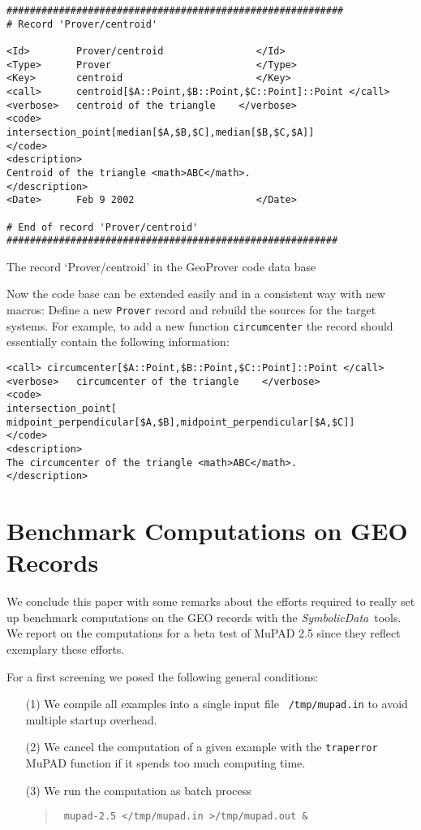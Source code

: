 \documentclass[11pt]{article}
\newcommand{\SD}{{\it Symbo\-lic\-Data}}
\newcommand{\gf}[1]{{\tt #1}\/}
\begin{document}
\begin{table}[ht]\label{table:3}{\small
\begin{verbatim}
##########################################################
# Record 'Prover/centroid' 

<Id>        Prover/centroid                </Id>
<Type>      Prover                         </Type>
<Key>       centroid                       </Key>
<call>      centroid[$A::Point,$B::Point,$C::Point]::Point </call>
<verbose>   centroid of the triangle    </verbose>
<code>      
intersection_point[median[$A,$B,$C],median[$B,$C,$A]] 
</code>
<description> 
Centroid of the triangle <math>ABC</math>. 
</description>
<Date>      Feb 9 2002                     </Date>
  
# End of record 'Prover/centroid'
#########################################################
\end{verbatim}}%
\centerline{The record `Prover/centroid' in the GeoProver code data
base}
\end{table}

Now the code base can be extended easily and in a consistent way
with new macros: Define a new {\tt Prover} record and rebuild the
sources for the target systems.  For example, to add a new
function \gf{circumcenter} the record should essentially contain
the following information:

{\small
\begin{verbatim}
<call> circumcenter[$A::Point,$B::Point,$C::Point]::Point </call>
<verbose>   circumcenter of the triangle    </verbose>
<code>      
intersection_point[
midpoint_perpendicular[$A,$B],midpoint_perpendicular[$A,$C]]
</code>
<description> 
The circumcenter of the triangle <math>ABC</math>. 
</description>
\end{verbatim}}%

\section{Benchmark Computations on GEO Records}
\label{benchmark} 

We conclude this paper with some remarks about the efforts required to
really set up benchmark computations on the GEO records with the \SD\
tools.  We report on the computations for a beta test of MuPAD 2.5
since they reflect exemplary these efforts.

For a first screening we posed the following general conditions:
\begin{itemize}\itemsep0pt
\item[(1)] We compile all examples into a single input file {\tt
/tmp/mupad.in} to avoid multiple startup overhead.
\item[(2)] We cancel the computation of a given example with the
{\tt traperror} MuPAD function if it spends too much computing
time.
\item[(3)] We run the computation as batch process
\begin{quote}\tt
mupad-2.5 </tmp/mupad.in >/tmp/mupad.out \&
\end{quote}
\end{itemize}
\end{document}
